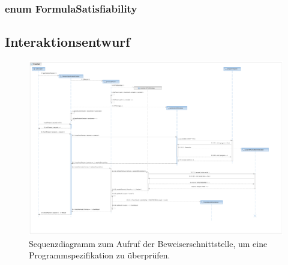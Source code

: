 %

\subsubsection{enum FormulaSatisfiability}%

\subsection{Interaktionsentwurf}%

\begin{landscape}%
    \begin{figure}[p]%
        \vspace{-2cm}%
        \includegraphics[height=1.2\textheight]{diagrams/programchecking_sequence.pdf}%

        \caption{Sequenzdiagramm zum Aufruf der Beweiserschnittstelle,
        um eine Programmspezifikation zu überprüfen.}%

    \end{figure}%
\end{landscape}%
